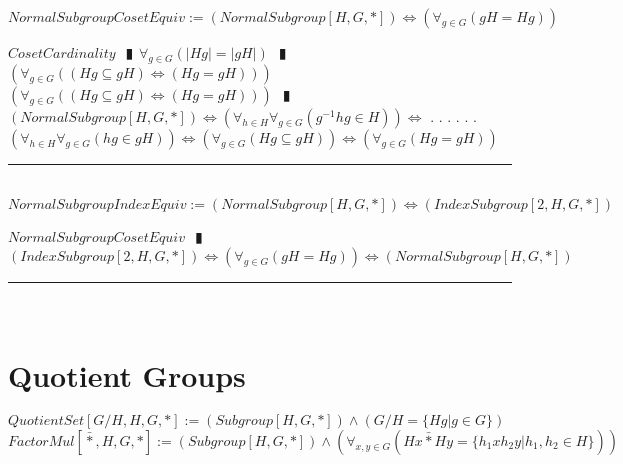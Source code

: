 \documentclass{book}
\newcommand{\abr}{:=}
\newcommand{\cont}{\phantom{.}. . .\phantom{.}}
\newcommand{\pipe}{$\phantom{(}\vrectangleblack\phantom{)}$}
\newcommand{\pr}[1]{\left(#1\right)}
\begin{document}
$NormalSubgroupCosetEquiv \abr (NormalSubgroup[H, G, *]) \iff \pr{\forall_{g \in G}(g H = H g)}$
\begin{enumerate}
  \lit $CosetCardinality$ \pipe $\forall_{g \in G}(|H g| = |g H|)$ \pipe $\pr{\forall_{g \in G}\pr{(H g \subseteq g H) \iff (H g = g H)}}$
  \lit $\pr{\forall_{g \in G}\pr{(H g \subseteq g H) \iff (H g = g H)}}$ \pipe $(NormalSubgroup[H, G, *]) \iff \pr{\forall_{h \in H} \forall_{g \in G}(g^{-1} h g \in H)} \iff$ \cont
  \lit \cont $\pr{\forall_{h \in H} \forall_{g \in G}(h g \in g H)} \iff \pr{\forall_{g \in G}(H g \subseteq g H)} \iff \pr{\forall_{g \in G}(H g = g H)}$
\end{enumerate} \vspace{.75mm} \hrule \vspace{.75mm} \ \\ 

$NormalSubgroupIndexEquiv \abr (NormalSubgroup[H, G, *]) \iff (IndexSubgroup[2, H, G, *])$
\begin{enumerate}
  \lit $NormalSubgroupCosetEquiv$ \pipe $(IndexSubgroup[2, H, G, *]) \iff \pr{\forall_{g \in G}(g H = H g)} \iff (NormalSubgroup[H, G, *])$
\end{enumerate} \vspace{.75mm} \hrule \vspace{.75mm} \ \\ 


\section{Quotient Groups}
$QuotientSet[G / H, H, G, *] \abr (Subgroup[H, G, *]) \land (G / H = \{H g | g \in G\})$ \\
$FactorMul[\bar{*}, H, G, *] \abr (Subgroup[H, G, *]) \land \pr{\forall_{x, y \in G}(H x \bar{*} H y = \{h_1 x h_2 y | h_1, h_2 \in H\})}$ \\
\end{document}

